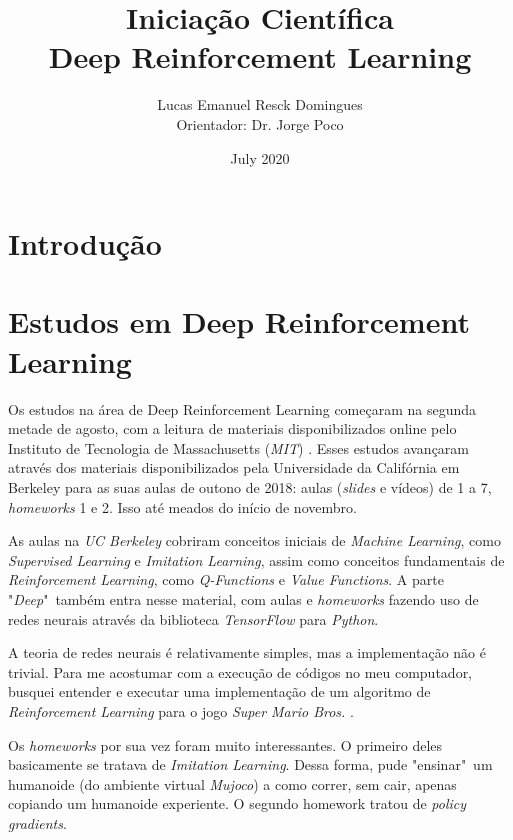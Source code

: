 \documentclass{article}
\title{Iniciação Científica\\
Deep Reinforcement Learning}
\author{Lucas Emanuel Resck Domingues\\
Orientador: Dr. Jorge Poco}
\date{July 2020}
\begin{document}
    \maketitle

    \section{Introdução}
    
    \section{Estudos em Deep Reinforcement Learning}

        Os estudos na área de Deep Reinforcement Learning
        começaram na segunda metade de agosto, com a leitura de
        materiais disponibilizados online pelo Instituto de Tecnologia
        de Massachusetts (\textit{MIT})
        . Esses estudos avançaram através dos materiais
        disponibilizados pela Universidade da Califórnia em Berkeley
        para as suas aulas de outono de 2018: aulas (\textit{slides} e vídeos) de 1 a 7,
        \textit{homeworks} 1 e 2. Isso até meados do início de novembro.

        As aulas na \textit{UC Berkeley} cobriram conceitos iniciais
        de \textit{Machine Learning}, como \textit{Supervised Learning} e \textit{Imitation
        Learning}, assim como conceitos fundamentais de \textit{Reinforcement Learning},
        como \textit{Q-Functions} e \textit{Value Functions}. A parte "\textit{Deep}"\ também entra
        nesse material, com aulas e \textit{homeworks} fazendo uso de redes neurais
        através da biblioteca \textit{TensorFlow} para \textit{Python}.

        A teoria de redes neurais é relativamente simples, mas a
        implementação não é trivial. Para me acostumar com a execução de códigos
        no meu computador, busquei entender e executar uma implementação de 
        um algoritmo de \textit{Reinforcement Learning} para o jogo \textit{Super
        Mario Bros.}
        .

        Os \textit{homeworks} por sua vez foram muito interessantes.
        O primeiro deles basicamente se tratava de \textit{Imitation Learning}.
        Dessa forma, pude "ensinar"\ um humanoide (do ambiente virtual \textit{Mujoco}) a como correr, sem cair,
        apenas copiando um humanoide experiente. O segundo homework tratou de 
        \textit{policy gradients}.
\end{document}
